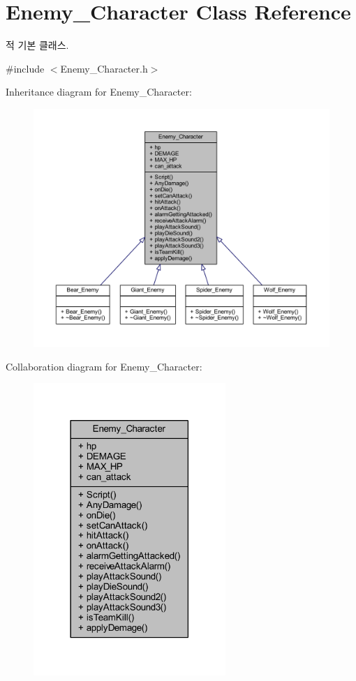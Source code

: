 \hypertarget{class_enemy___character}{}\section{Enemy\+\_\+\+Character Class Reference}
\label{class_enemy___character}


적 기본 클래스.  




{\ttfamily \#include $<$Enemy\+\_\+\+Character.\+h$>$}



Inheritance diagram for Enemy\+\_\+\+Character\+:
\nopagebreak
\begin{figure}[H]
\begin{center}
\leavevmode
\includegraphics[width=350pt]{class_enemy___character__inherit__graph}
\end{center}
\end{figure}


Collaboration diagram for Enemy\+\_\+\+Character\+:
\nopagebreak
\begin{figure}[H]
\begin{center}
\leavevmode
\includegraphics[width=206pt]{class_enemy___character__coll__graph}
\end{center}
\end{figure}
